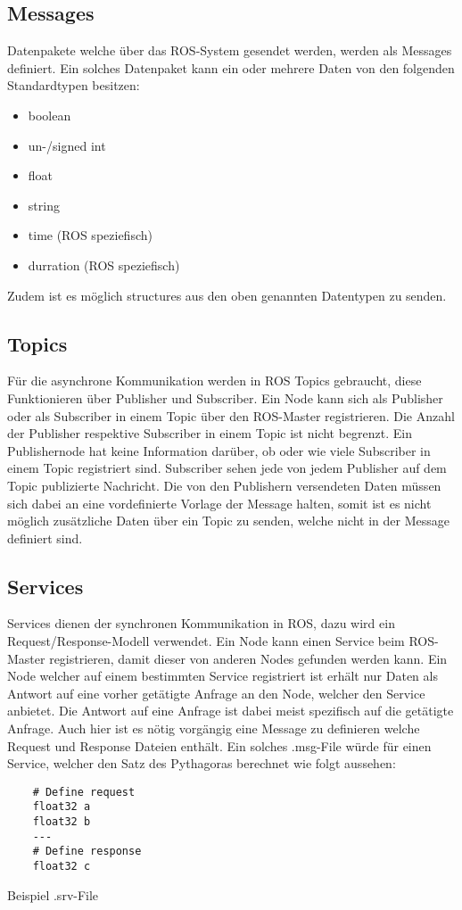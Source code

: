 \subsection{Messages}
Datenpakete welche über das ROS-System gesendet werden, werden als Messages definiert. Ein solches Datenpaket kann ein oder mehrere Daten von den folgenden Standardtypen besitzen:
\begin{itemize}
	\item boolean
	\item un-/signed int
	\item float
	\item string
	\item time (ROS speziefisch)
	\item durration (ROS speziefisch)
\end{itemize}
Zudem ist es möglich structures aus den oben genannten Datentypen zu senden. 

\subsection{Topics}
Für die asynchrone Kommunikation werden in ROS Topics gebraucht, diese Funktionieren über Publisher und Subscriber. Ein Node kann sich als Publisher oder als Subscriber in einem Topic über den ROS-Master registrieren. Die Anzahl der Publisher respektive Subscriber in einem Topic ist nicht begrenzt. Ein Publishernode hat keine Information darüber, ob oder wie viele Subscriber in einem Topic registriert sind. Subscriber sehen jede von jedem Publisher auf dem Topic publizierte Nachricht. Die von den Publishern versendeten Daten müssen sich dabei an eine vordefinierte Vorlage der Message halten, somit ist es nicht möglich zusätzliche Daten über ein Topic zu senden, welche nicht in der Message definiert sind. 

\subsection{Services}
Services dienen der synchronen Kommunikation in ROS, dazu wird ein Request/Response-Modell verwendet. Ein Node kann einen Service beim ROS-Master registrieren, damit dieser von anderen Nodes gefunden werden kann. Ein Node welcher auf einem bestimmten Service registriert ist erhält nur Daten als Antwort auf eine vorher getätigte Anfrage an den Node, welcher den Service anbietet. Die Antwort auf eine Anfrage ist dabei meist spezifisch auf die getätigte Anfrage. Auch hier ist es nötig vorgängig eine Message zu definieren welche Request und Response Dateien enthält. Ein solches .msg-File würde für einen Service, welcher den Satz des Pythagoras berechnet wie folgt aussehen:
\begin{code}
	\begin{verbatim}
	# Define request
	float32 a  
	float32 b
	---
	# Define response
	float32 c	
	\end{verbatim}
	\vspace{-15pt}
	\caption{Beispiel .srv-File}
	\label{code:BeispielSrvFile}
\end{code}


